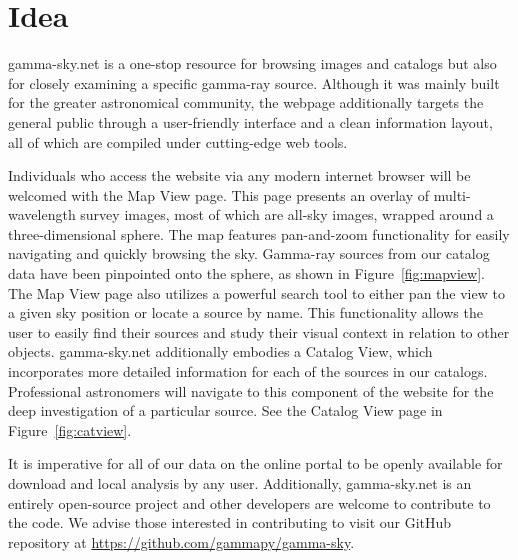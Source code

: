 \section{Idea}

gamma-sky.net is a one-stop resource for browsing images and catalogs but also for closely examining a specific gamma-ray source. Although it was mainly built for the greater astronomical community, the webpage additionally targets the general public through a user-friendly interface and a clean information layout, all of which are compiled under cutting-edge web tools.

Individuals who access the website via any modern internet browser will be welcomed with the Map View page. This page presents an overlay of multi-wavelength survey images, most of which are all-sky images, wrapped around a three-dimensional sphere. The map features pan-and-zoom functionality for easily navigating and quickly browsing the sky. Gamma-ray sources from our catalog data have been pinpointed onto the sphere, as shown in Figure~\ref{fig:mapview}. The Map View page also utilizes a powerful search tool to either pan the view to a given sky position or locate a source by name. This functionality allows the user to easily find their sources and study their visual context in relation to other objects. gamma-sky.net additionally embodies a Catalog View, which incorporates more detailed information for each of the sources in our catalogs. Professional astronomers will navigate to this component of the website for the deep investigation of a particular source. See the Catalog View page in Figure~\ref{fig:catview}.

It is imperative for all of our data on the online portal to be openly available for download and local analysis by any user. Additionally, gamma-sky.net is an entirely open-source project and other developers are welcome to contribute to the code. We advise those interested in contributing to visit our GitHub repository at \url{https://github.com/gammapy/gamma-sky}.
